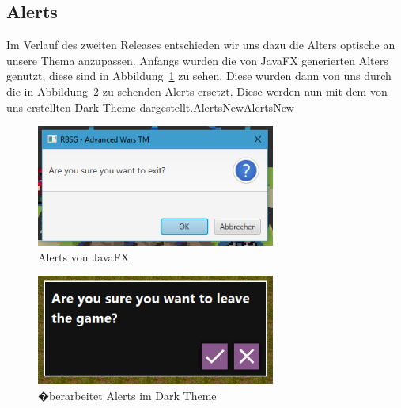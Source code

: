 \documentclass[12pt, titlepage]{scrartcl}
\newcommand{\Abb}[1]{%
	Abbildung\ \ref{#1}%
}
\begin{document}
			\subsection{Alerts}
			Im Verlauf des zweiten Releases entschieden wir uns dazu die Alters optische an unsere Thema anzupassen. Anfangs wurden die von JavaFX generierten Alters genutzt, diese sind in \Abb{AlertsOld} zu sehen. Diese wurden dann von uns durch die in \Abb{AlertsNew} zu sehenden Alerts ersetzt. Diese werden nun mit dem von uns erstellten Dark Theme dargestellt.AlertsNewAlertsNew
			\begin{figure}[H] 
				\centering
				\includegraphics[width=0.7\textwidth]{Alert_Old.PNG}
				\caption{Alerts von JavaFX}
				\label{AlertsOld}
			\end{figure}
		
			\begin{figure}[H] 
				\centering
				\includegraphics[width=0.7\textwidth]{Alerts_New_Style.PNG}
				\caption{�berarbeitet Alerts im Dark Theme}
				\label{AlertsNew}
			\end{figure} 
		
	\newpage
	\appendix
	\listoffigures
	\listoftables
\end{document}
